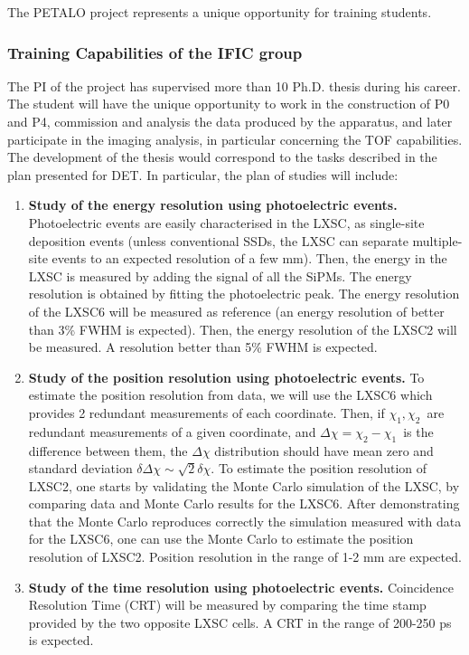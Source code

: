 The PETALO project represents a unique opportunity for training students. 

\subsubsection*{Training Capabilities of the IFIC group}

The PI of the project has supervised more than 10 Ph.D. thesis during his career. The student will have the unique opportunity to work in the construction of P0 and P4, commission and analysis the data produced by the apparatus, and later participate in the imaging analysis, in particular concerning the TOF capabilities. The development of the thesis would correspond to the tasks described in the plan presented for DET. In particular, the plan of studies will include:

\begin{enumerate}
\item {\bf Study of the energy resolution using photoelectric events.} Photoelectric events are easily characterised in the LXSC, as single-site deposition events (unless conventional SSDs, the LXSC can separate multiple-site events to an expected resolution of a few mm). Then, the energy in the LXSC is measured by adding the signal of all the SiPMs. The energy resolution is obtained by fitting the photoelectric peak. The energy resolution of the LXSC6 will be measured as reference (an energy resolution of better than 3\% FWHM is expected). Then, the energy resolution of the LXSC2 will be measured. A resolution better than 5\% FWHM is expected.
\item {\bf Study of the position resolution using photoelectric events.} To estimate the position resolution from data, we will use the LXSC6 which provides 2 redundant measurements of each coordinate. Then, if $\chi_1,\chi_2$~are redundant measurements of a given coordinate, and $\Delta \chi = \chi_2 - \chi_1$~is the difference between them, the $\Delta \chi$ distribution should have mean zero and standard deviation  
$\delta \Delta \chi \sim \sqrt{2} \delta \chi$. To estimate the position resolution of LXSC2, one starts by validating the Monte Carlo simulation of the LXSC, by comparing data and Monte Carlo results for the LXSC6. After demonstrating that the Monte Carlo reproduces correctly the simulation measured with data for the LXSC6, one can use the Monte Carlo to estimate the position resolution of LXSC2. Position resolution in the range of 1-2 mm are expected. 
\item {\bf Study of the time resolution using photoelectric events.} Coincidence Resolution Time (CRT) will be measured by comparing the time stamp provided by the two opposite LXSC cells. A CRT in the range of 200-250 ps is expected.
\end{enumerate}

